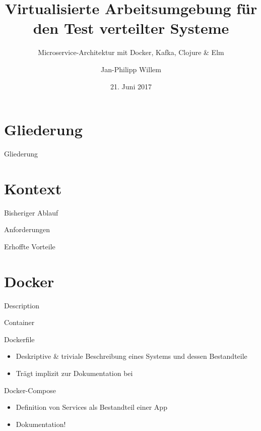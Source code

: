 \documentclass[compress]{beamer}
\title{Virtualisierte Arbeitsumgebung für den Test verteilter Systeme}
\subtitle{Microservice-Architektur mit Docker, Kafka, Clojure \& Elm}
\author{Jan-Philipp Willem}
\institute{Fakultät für Informatik\\Hochschule Mannheim}
\date{21. Juni 2017}
\begin{document}

\maketitle


\section*{Gliederung}
\begin{frame}{Gliederung}
  \tableofcontents[hideallsubsections]
\end{frame}

\section{Kontext}
\begin{frame}{Bisheriger Ablauf}
\end{frame}
\begin{frame}{Anforderungen}
\end{frame}
\begin{frame}{Erhoffte Vorteile}
\end{frame}

\section{Docker}
\begin{frame}{Description}
\end{frame}
\begin{frame}{Container}
  \begin{itemize}
  \end{itemize}
\end{frame}
\begin{frame}{Dockerfile}
  \begin{itemize}
    \item Deskriptive \& triviale Beschreibung eines Systems und dessen Bestandteile
    \item Trägt implizit zur Dokumentation bei
  \end{itemize}
\end{frame}
\begin{frame}{Docker-Compose}
  \begin{itemize}
    \item Definition von Services als Bestandteil einer App
    \item Dokumentation!
  \end{itemize}
\end{frame}
\end{document}
